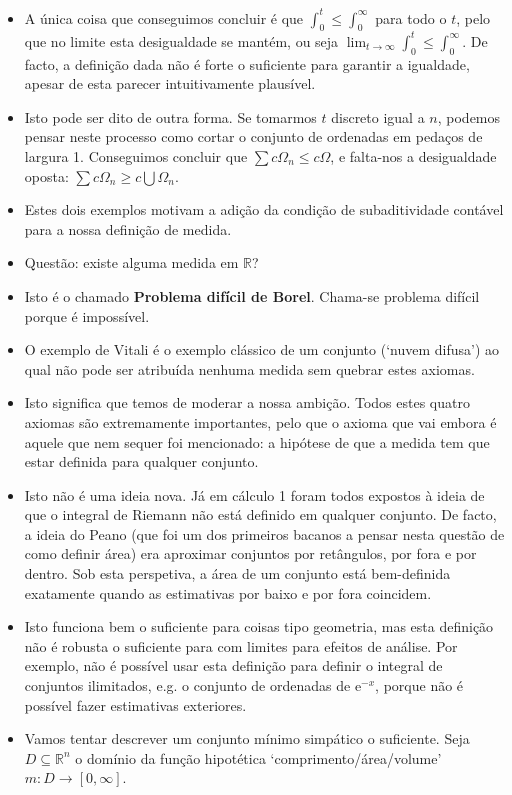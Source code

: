 \documentclass{article}
\newcommand{\R}{\mathbb{R}}
\newcommand{\e}{\mathrm{e}}
\begin{document}
\begin{itemize}
\item A única coisa que conseguimos concluir é que $\int_0^t \leq \int_0^\infty$ para todo o $t$, pelo que no limite esta desigualdade se mantém, ou seja $\lim_{t \to \infty} \int_0^t \leq \int_0^\infty$. De facto, a definição dada não é forte o suficiente para garantir a igualdade, apesar de esta parecer intuitivamente plausível.
\item Isto pode ser dito de outra forma. Se tomarmos $t$ discreto igual a $n$, podemos pensar neste processo como cortar o conjunto de ordenadas em pedaços de largura 1. Conseguimos concluir que $\sum c \Omega_n \leq c \Omega$, e falta-nos a desigualdade oposta: $\sum c \Omega_n \geq c \bigcup \Omega_n$.
\item Estes dois exemplos motivam a adição da condição de subaditividade contável para a nossa definição de medida.
\item Questão: existe alguma medida em $\R$?
\item Isto é o chamado \textbf{Problema difícil de Borel}. Chama-se problema difícil porque é impossível.
\item O exemplo de Vitali é o exemplo clássico de um conjunto (`nuvem difusa') ao qual não pode ser atribuída nenhuma medida sem quebrar estes axiomas.
\item Isto significa que temos de moderar a nossa ambição. Todos estes quatro axiomas são extremamente importantes, pelo que o axioma que vai embora é aquele que nem sequer foi mencionado: a hipótese de que a medida tem que estar definida para qualquer conjunto.
\item Isto não é uma ideia nova. Já em cálculo 1 foram todos expostos à ideia de que o integral de Riemann não está definido em qualquer conjunto. De facto, a ideia do Peano (que foi um dos primeiros bacanos a pensar nesta questão de como definir área) era aproximar conjuntos por retângulos, por fora e por dentro. Sob esta perspetiva, a área de um conjunto está bem-definida exatamente quando as estimativas por baixo e por fora coincidem.
\item Isto funciona bem o suficiente para coisas tipo geometria, mas esta definição não é robusta o suficiente para com limites para efeitos de análise. Por exemplo, não é possível usar esta definição para definir o integral de conjuntos ilimitados, e.g. o conjunto de ordenadas de $\e^{-x}$, porque não é possível fazer estimativas exteriores.
\item Vamos tentar descrever um conjunto mínimo simpático o suficiente. Seja $D \subseteq \R^n$ o domínio da função hipotética `comprimento/área/volume' $m : D \to \left[0,\infty\right]$.

\end{itemize}
\end{document}
